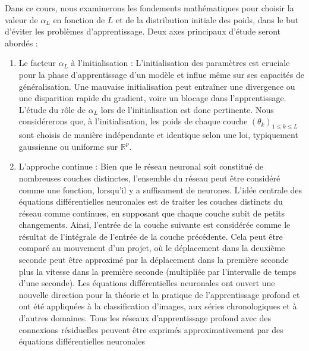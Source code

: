 Dans ce cours, nous examinerons les fondements mathématiques pour choisir la valeur de $\alpha_L$ en fonction de $L$ et de la distribution initiale des poids, dans le but d'éviter les problèmes d'apprentissage. Deux axes principaux d'étude seront abordés :
\begin{enumerate}
    \item Le facteur $\alpha_L$ à l'initialisation : L'initialisation des paramètres est cruciale pour la phase d'apprentissage d'un modèle et influe même sur ses capacités de généralisation. Une mauvaise initialisation peut entraîner une divergence ou une disparition rapide du gradient, voire un blocage dans l'apprentissage. L'étude du rôle de $\alpha_L$ lors de l'initialisation est donc pertinente. Nous considérerons que, à l'initialisation, les poids de chaque couche $(\theta_k)_{1 \leq k \leq L}$ sont choisis de manière indépendante et identique selon une loi, typiquement gaussienne ou uniforme sur $\mathbb{R}^p$. 
    \item L'approche continue : Bien que le réseau neuronal soit constitué de nombreuses couches distinctes, l'ensemble du réseau peut être considéré comme une fonction, lorsqu'il y a suffisament de neurones. L'idée centrale des équations différentielles neuronales est de traiter les couches distincts du réseau comme continues, en supposant que chaque couche subit de petits changements. Ainsi, l'entrée de la couche suivante est considérée comme le résultat de l'intégrale de l'entrée de la couche précédente. Cela peut être comparé au mouvement d'un projet, où le déplacement dans la deuxième seconde peut être approximé par la déplacement dans la première seconde plus la vitesse dans la première seconde (multipliée par l'intervalle de temps d'une seconde).
    Les équations différentielles neuronales ont ouvert une nouvelle direction pour la théorie et la pratique de l’apprentissage profond et ont été appliquées à la classification d’images, aux séries chronologiques et à d’autres domaines. Tous les réseaux d'apprentissage profond avec des connexions résiduelles peuvent être exprimés approximativement par des équations différentielles neuronales
\end{enumerate}